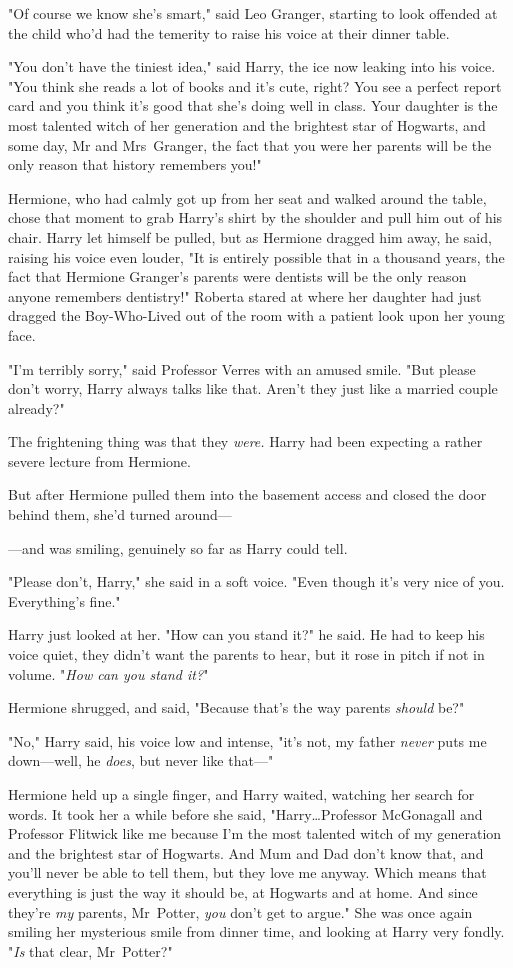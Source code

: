 "Of course we know she's smart," said Leo Granger, starting to look offended at
the child who'd had the temerity to raise his voice at their dinner table.

"You don't have the tiniest idea," said Harry, the ice now leaking into his
voice. "You think she reads a lot of books and it's cute, right? You see a
perfect report card and you think it's good that she's doing well in class.
Your daughter is the most talented witch of her generation and the brightest
star of Hogwarts, and some day, Mr and Mrs~Granger, the fact that you were her
parents will be the only reason that history remembers you!"

Hermione, who had calmly got up from her seat and walked around the table,
chose that moment to grab Harry's shirt by the shoulder and pull him out of his
chair. Harry let himself be pulled, but as Hermione dragged him away, he said,
raising his voice even louder, "It is entirely possible that in a thousand
years, the fact that Hermione Granger's parents were dentists will be the only
reason anyone remembers dentistry!"
\later
Roberta stared at where her daughter had just dragged the Boy-Who-Lived out of
the room with a patient look upon her young face.

"I'm terribly sorry," said Professor Verres with an amused smile. "But please
don't worry, Harry always talks like that. Aren't they just like a married
couple already?"

The frightening thing was that they \emph{were.}
\later
Harry had been expecting a rather severe lecture from Hermione.

But after Hermione pulled them into the basement access and closed the door
behind them, she'd turned around—

—and was smiling, genuinely so far as Harry could tell.

"Please don't, Harry," she said in a soft voice. "Even though it's very nice of
you. Everything's fine."

Harry just looked at her. "How can you stand it?" he said. He had to keep his
voice quiet, they didn't want the parents to hear, but it rose in pitch if not
in volume. "\emph{How can you stand it?}"

Hermione shrugged, and said, "Because that's the way parents \emph{should} be?"

"No," Harry said, his voice low and intense, "it's not, my father \emph{never}
puts me down—well, he \emph{does}, but never like that—"

Hermione held up a single finger, and Harry waited, watching her search for
words. It took her a while before she said, "Harry…Professor McGonagall
and Professor Flitwick like me because I'm the most talented witch of my
generation and the brightest star of Hogwarts. And Mum and Dad don't know that,
and you'll never be able to tell them, but they love me anyway. Which means
that everything is just the way it should be, at Hogwarts and at home. And
since they're \emph{my} parents, Mr~Potter, \emph{you} don't get to argue."
She was once again smiling her mysterious smile from dinner time, and looking at
Harry very fondly. "\emph{Is} that clear, Mr~Potter?"

